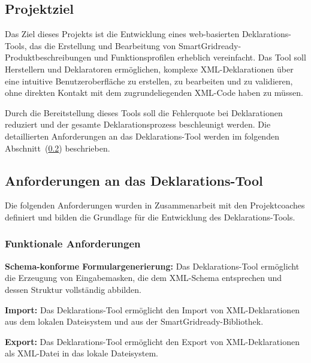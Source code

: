 \documentclass[a4paper,12pt]{article}
\begin{document}
\subsection{Projektziel}

Das Ziel dieses Projekts ist die Entwicklung eines web-basierten Deklarations-Tools, das die Erstellung und 
Bearbeitung von SmartGridready-Produktbeschreibungen und Funktionsprofilen erheblich vereinfacht. Das Tool soll 
Herstellern und Deklaratoren ermöglichen, komplexe XML-Deklarationen über eine intuitive Benutzeroberfläche zu 
erstellen, zu bearbeiten und zu validieren, ohne direkten Kontakt mit dem zugrundeliegenden XML-Code haben zu 
müssen.

Durch die Bereitstellung dieses Tools soll die Fehlerquote bei Deklarationen reduziert und der gesamte 
Deklarationsprozess beschleunigt werden. Die detaillierten Anforderungen an das Deklarations-Tool werden im 
folgenden Abschnitt~(\ref{sec:anforderungen}) beschrieben.

\newpage

\subsection{Anforderungen an das Deklarations-Tool}
\label{sec:anforderungen}

Die folgenden Anforderungen wurden in Zusammenarbeit mit den Projektcoaches definiert und bilden die Grundlage 
für die Entwicklung des Deklarations-Tools.

\subsubsection{Funktionale Anforderungen}

\noindent\textbf{Schema-konforme Formulargenerierung:}
Das Deklarations-Tool ermöglicht die Erzeugung von Eingabemasken, die dem XML-Schema entsprechen und dessen 
Struktur vollständig abbilden.
\newline

\noindent\textbf{Import:}
Das Deklarations-Tool ermöglicht den Import von XML-Deklarationen aus dem lokalen Dateisystem und aus der 
SmartGridready-Bibliothek.
\newline

\noindent\textbf{Export:}
Das Deklarations-Tool ermöglicht den Export von XML-Deklarationen als XML-Datei in das lokale Dateisystem.
\newline
\end{document}
